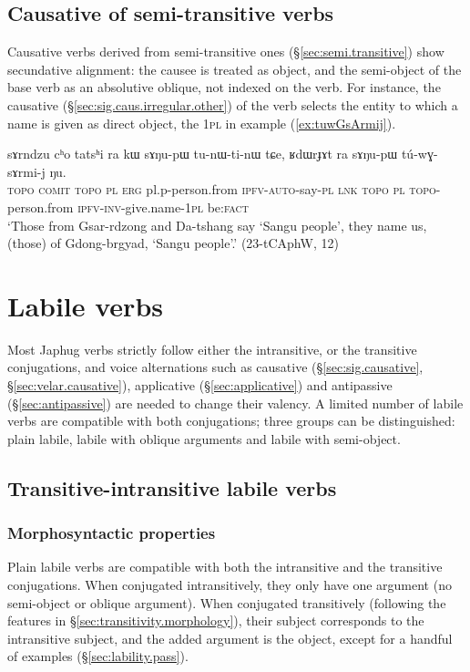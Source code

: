 \subsection{Causative of semi-transitive verbs} \label{sec:semi.transitive.causative}
Causative verbs derived from semi-transitive ones (§\ref{sec:semi.transitive}) show secundative alignment: the causee is treated as object, and the semi-object of the base verb as an absolutive oblique, not indexed on the verb. For instance, the causative  (§\ref{sec:sig.caus.irregular.other}) of the verb  selects the entity to which a name is given as direct object, the \textsc{1pl} in example (\ref{ex:tuwGsArmij}).

\begin{exe}
	\ex \label{ex:tuwGsArmij}
	\gll   sɤrndzu cʰo tatsʰi ra kɯ sɤŋu-pɯ tu-nɯ-ti-nɯ tɕe, ʁdɯrɟɤt ra sɤŋu-pɯ tú-wɣ-sɤrmi-j ŋu. \\
	\textsc{topo} \textsc{comit}  \textsc{topo} \textsc{pl} \textsc{erg} pl.p-person.from \textsc{ipfv}-\textsc{auto}-say-\textsc{pl} \textsc{lnk} \textsc{topo} \textsc{pl} \textsc{topo}-person.from \textsc{ipfv}-\textsc{inv}-give.name-\textsc{1pl} be:\textsc{fact} \\
	\glt `Those from Gsar-rdzong and Da-tshang say `Sangu people', they name us, (those) of Gdong-brgyad, `Sangu people'.' (23-tCAphW, 12)
\end{exe}


\section{Labile verbs} \label{sec:lability}
Most Japhug verbs strictly follow either the intransitive, or the transitive conjugations, and voice alternations such as causative (§\ref{sec:sig.causative}, §\ref{sec:velar.causative}), applicative (§\ref{sec:applicative}) and antipassive (§\ref{sec:antipassive}) are needed to change their valency. A limited number of labile verbs are compatible with both conjugations; three groups can be distinguished: plain labile, labile with oblique arguments and labile with semi-object.

\subsection{Transitive-intransitive labile verbs} \label{sec:labile.tr-intr}

\subsubsection{Morphosyntactic properties} \label{sec:lability.morphosyntax}
Plain labile verbs are compatible with both the intransitive and the transitive conjugations. When conjugated intransitively, they only have one argument (no semi-object or oblique argument). When conjugated transitively (following the features in §\ref{sec:transitivity.morphology}), their subject corresponds to the intransitive subject, and the added argument is the object, except for a handful of examples (§\ref{sec:lability.pass}).

